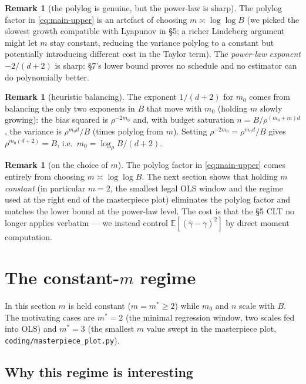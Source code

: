 \documentclass[11pt]{article}
\newcommand{\E}{\mathbb{E}}
\theoremstyle{plain}
\theoremstyle{definition}
\newtheorem{remark}[theorem]{Remark}
\begin{document}
\begin{remark}[the polylog is genuine, but the power-law is sharp]
The polylog factor in \eqref{eq:main-upper} is an artefact of
choosing $m \asymp \log\log B$ (we picked the slowest growth
compatible with Lyapunov in §5; a richer Lindeberg argument might let
$m$ stay constant, reducing the variance polylog to a constant but
potentially introducing different cost in the Taylor term). The
\emph{power-law exponent} $-2/(d+2)$ is sharp: §7's lower bound
proves no schedule and no estimator can do polynomially better.
\end{remark}

\begin{remark}[heuristic balancing]
The exponent $1/(d+2)$ for $m_0$ comes from balancing the only two
exponents in $B$ that move with $m_0$ (holding $m$ slowly growing):
the bias squared is $\rho^{-2m_0}$ and, with budget saturation
$n = B/\rho^{(m_0+m)d}$, the variance is $\rho^{m_0 d}/B$ (times
polylog from $m$). Setting $\rho^{-2m_0} = \rho^{m_0 d}/B$ gives
$\rho^{m_0(d+2)} = B$, i.e.\ $m_0 = \log_\rho B/(d+2)$.
\end{remark}

\begin{remark}[on the choice of $m$]
The polylog factor in \eqref{eq:main-upper} comes entirely from
choosing $m \asymp \log\log B$. The next section shows that holding
$m$ \emph{constant} (in particular $m=2$, the smallest legal OLS
window and the regime used at the right end of the masterpiece plot)
eliminates the polylog factor and matches the lower bound at the
power-law level. The cost is that the §5 CLT no longer applies
verbatim --- we instead control $\E[(\hat\gamma-\gamma)^{2}]$ by
direct moment computation.
\end{remark}

\section{The constant-$m$ regime}\label{sec:const-m}

In this section $m$ is held constant ($m=m^{\ast}\ge 2$) while $m_0$
and $n$ scale with $B$. The motivating cases are $m^{\ast}=2$ (the
minimal regression window, two scales fed into OLS) and $m^{\ast}=3$
(the smallest $m$ value swept in the masterpiece plot,
\texttt{coding/masterpiece\_plot.py}).

\subsection*{Why this regime is interesting}
\end{document}
